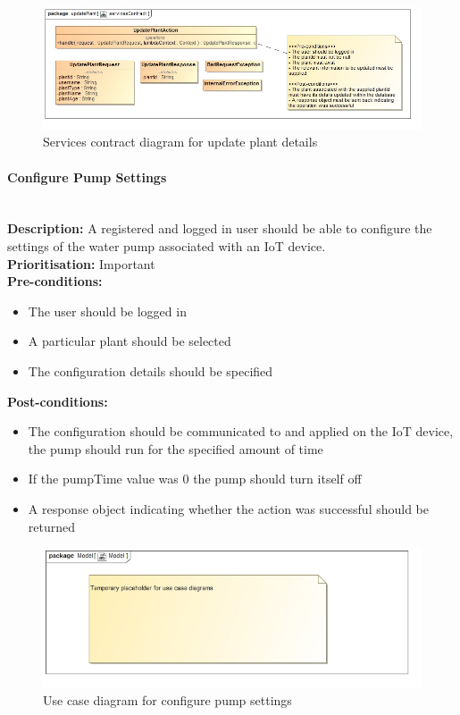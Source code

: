 \documentclass{article}
\begin{document}
		\begin{figure}[H]
			\includegraphics[width=\linewidth]{images/ServicesContracts/updatePlant.jpg}
			\caption{Services contract diagram for update plant details}
		\end{figure}		
		
	\paragraph{Configure Pump Settings}\mbox{}\\
		\textbf{Description:} A registered and logged in user should be able to configure the settings of the water pump associated with an IoT device.\\
		\textbf{Prioritisation:} Important\\		
		\textbf{Pre-conditions:}
			\begin{itemize}
				\item The user should be logged in
				\item A particular plant should be selected
				\item The configuration details should be specified
			\end{itemize}
		\textbf{Post-conditions:}
			\begin{itemize}
				\item The configuration should be communicated to and applied on the IoT device, the pump should run for the specified amount of time
				\item If the pumpTime value was 0 the pump should turn itself off
				\item A response object indicating whether the action was successful should be returned
			\end{itemize}

		\begin{figure}[H]
			\includegraphics[width=\linewidth]{images/tempUseCase.jpg}
			\caption{Use case diagram for configure pump settings}
		\end{figure}
		
\end{document}
